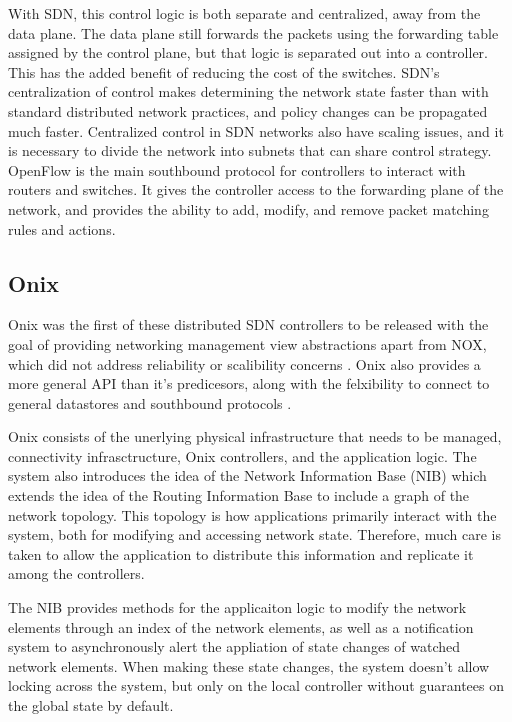 \documentclass[letterpaper,twocolumn,10pt]{article}
\begin{document}
With SDN, this control logic is both separate and centralized, away from the data plane. The data plane still forwards the packets using the forwarding table assigned by the control plane, but that logic is separated out into a controller. This has the added benefit of reducing the cost of the switches. SDN's centralization of control makes determining the network state faster than with standard distributed network practices, and policy changes can be propagated much faster.
Centralized control in SDN networks also have scaling issues, and it is necessary to divide the network into subnets that can share control strategy. OpenFlow is the main southbound protocol for controllers to interact with routers and switches. It gives the controller access to the forwarding plane of the network, and provides the ability to add, modify, and remove packet matching rules and actions.\cite{mckeown2008openflow}

% 
% 
\subsection{Onix}

Onix was the first of these distributed SDN controllers to be released with the goal of providing networking management view abstractions apart from NOX, which did not address reliability or scalibility concerns \cite{feamster2014road}. Onix also provides a more general API than it's predicesors, along with the felxibility to connect to general datastores and southbound protocols \cite{koponen2010onix}.

Onix consists of the unerlying physical infrastructure that needs to be managed, connectivity infrasctructure, Onix controllers, and the application logic. The system also introduces the idea of the Network Information Base (NIB) which extends the idea of the Routing Information Base to include a graph of the network topology. This topology is how applications primarily interact with the system, both for modifying and accessing network state. Therefore, much care is taken to allow the application to distribute this information and replicate it among the controllers.

The NIB provides methods for the applicaiton logic to modify the network elements through an index of the network elements, as well as a notification system to asynchronously alert the appliation of state changes of watched network elements. When making these state changes, the system doesn't allow locking across the system, but only on the local controller without guarantees on the global state by default. 
\end{document}
